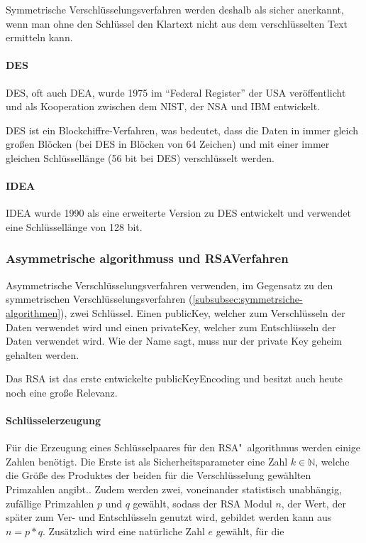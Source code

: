 Symmetrische Verschlüsselungsverfahren werden deshalb als sicher anerkannt, wenn man ohne den Schlüssel den Klartext nicht aus dem verschlüsselten Text ermitteln kann.\autocite[\pagef~5]{kryptographische_algorithmen}

\paragraph{\acf{DES}}\label{par:data-encryption-standard}
\ac{DES}, oft auch \ac{DEA}, wurde 1975 im ``Federal Register'' der USA
veröffentlicht und als Kooperation zwischen dem \ac{NIST}, der \ac{NSA} und IBM entwickelt.\autocite[\pagef~232]{nsa-meyer}

\ac{DES} ist ein Blockchiffre-Verfahren, was bedeutet, dass die Daten in immer gleich großen Blöcken (bei \ac{DES} in Blöcken von 64 Zeichen) und mit einer immer gleichen Schlüssellänge (56 bit bei \ac{DES}) verschlüsselt werden.\autocite[\pagef~6]{kryptographische_algorithmen}

\paragraph{\acf{IDEA}}\label{par:internet-datatencryption-algorithm}
\ac{IDEA} wurde 1990 als eine erweiterte Version zu \ac{DES} entwickelt und verwendet eine Schlüssellänge von 128 bit.\autocite[\pagef~6]{kryptographische_algorithmen}

\subsubsection[Asymmetrische Algorithmen und RSA-Verfahren]{Asymmetrische \glspl{algorithmus} und \acs{RSA}\nobreakdash Verfahren}\label{subsubsec:asymmetrische-algorithmen}
Asymmetrische Verschlüsselungsverfahren verwenden, im Gegensatz zu den symmetrischen Verschlüsselungsverfahren (\autoref{subsubsec:symmetrsiche-algorithmen}), zwei Schlüssel.
Einen \gls{publicKey}, welcher zum Verschlüsseln der Daten verwendet wird und einen \gls{privateKey}, welcher zum Entschlüsseln der Daten verwendet wird.
Wie der Name sagt, muss nur der private Key geheim gehalten werden.

Das \ac{RSA} ist das erste entwickelte \gls{publicKeyEncoding} und besitzt auch heute noch eine große Relevanz.\autocite[\pagef~168]{buchmann_einfuhrung_2016}

\paragraph[Schlüsselerzeugung]{Schlüsselerzeugung}\label{par:schluesselerzeugung}
Für die Erzeugung eines Schlüsselpaares für den \ac{RSA}"~\gls{algorithmus} werden einige Zahlen benötigt.
Die Erste ist als Sicherheitsparameter eine Zahl \(k \in \mathbb{N}\), welche die Größe des Produktes der beiden für die Verschlüsselung gewählten Primzahlen angibt..
Zudem werden zwei, voneinander statistisch unabhängig, zufällige Primzahlen $p$ und $q$ gewählt, sodass der \ac{RSA} Modul $n$, der Wert, der später zum Ver- und Entschlüsseln genutzt wird, gebildet werden kann aus \(n = p*q\).
Zusätzlich wird eine natürliche Zahl $e$ gewählt, für die

